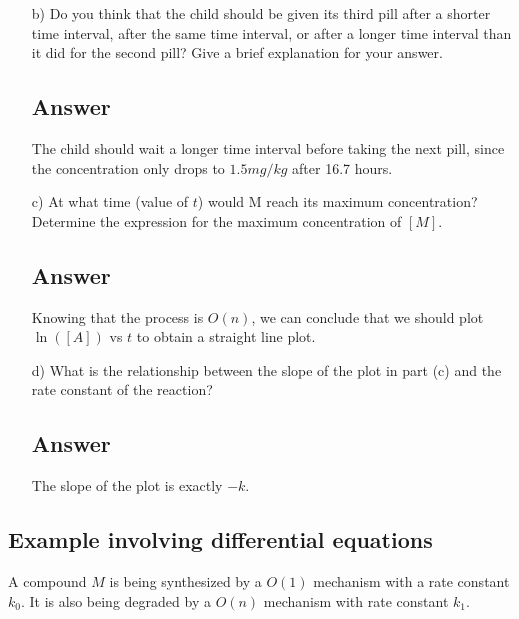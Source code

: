 \documentclass[12pt]{book}
\begin{document}
\begin{itemize}
    \item[b)]Do you think that the child should be given its third pill after a shorter time interval, after the same time interval, or after a longer time interval than it did for the second
    pill? Give a brief explanation for your answer.

    \subsection*{Answer}
    The child should wait a longer time interval before taking the next pill, since the concentration only drops to $1.5 mg/kg$ after 16.7 hours.

    \item[c)] At what time (value of $t$) would M reach its maximum concentration? Determine the
    expression for the maximum concentration of $[M]$.
    
    \subsection*{Answer}
    Knowing that the process is $O(n)$, we can conclude that we should plot $\ln([A])$ vs $t$ to obtain a straight line plot.

    \item[d)] What is the relationship between the slope of the plot in part (c) and the rate
    constant of the reaction?

    \subsection*{Answer}

    The slope of the plot is exactly $-k$.

\end{itemize}

\subsection*{Example involving differential equations}

A compound $M$ is being synthesized by a $O(1)$ mechanism with a rate constant $k_0$. It is also being degraded by a $O(n)$ mechanism with rate constant $k_1$.
\end{document}
